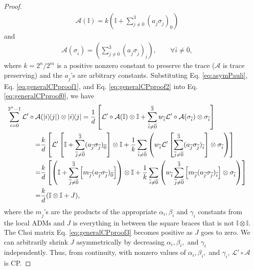 \documentclass[12pt]{iopart}
\begin{document}
\begin{proof}
\begin{align}
        \mathcal{A}(\mathbb{I})=k\left(\mathbb{I}+\sum_{\overline{j}\neq \overline{0}}^{\overline{3}}(a_{\overline{j}}\sigma_{\overline{j}})_0\right)
    \end{align}
    and
    \begin{align}\label{eq:generalCPproof2}
        \mathcal{A}(\sigma_{\overline{i}})=\left(\sum_{\overline{j}\neq \overline{0}}^{\overline{3}}(a_{\overline{j}}\sigma_{\overline{j}})_{\overline{i}}\right),\qquad \forall \overline{i}\neq \overline{0},
    \end{align}
where $k=2^n/2^m$ is a positive nonzero constant to preserve the trace ($\mathcal{A}$ is trace preserving) and the $a_{\overline{j}}$'s are arbitrary constants. Substituting Eq. \eqref{eq:asymPauli}, Eq. \eqref{eq:generalCPproof1}, and Eq. \eqref{eq:generalCPproof2} into Eq. \eqref{eq:generalCPproof0}, we have
\begin{align}\label{eq:generalCPproof3}
    \notag\sum_{i=0}^{2^n-1}\mathcal{L'}\circ\mathcal{A}&(\op{i}{j})\otimes\op{i}{j}=\dfrac{1}{d}\left[\mathcal{L'}\circ\mathcal{A}(\mathbb{I})\otimes\mathbb{I}+\sum_{\overline{i}\neq\overline{0}}^{\overline{3}} w_{\overline{i}}\mathcal{L'}\circ\mathcal{A}(\sigma_{\overline{i}})\otimes\sigma_{\overline{i}}\right]\\
    \notag =&\dfrac{k}{d}\left[\mathcal{L'}\left[\mathbb{I}+\sum_{\overline{j}\neq \overline{0}}^{\overline{3}}(a_{\overline{j}}\sigma_{\overline{j}})_{\overline{0}}\right]\otimes\mathbb{I}+\dfrac{1}{k}\sum_{\overline{i}\neq \overline{0}}\left(w_{\overline{i}}\mathcal{L'}\left[\sum_{\overline{j}\neq \overline{0}}^{\overline{3}}(a_{\overline{j}}\sigma_{\overline{j}})_{\overline{i}}\right]\otimes\sigma_{\overline{i}}\right)\right]\\
    \notag=&\dfrac{k}{d}\left[\left(\mathbb{I}+\sum_{\overline{j}\neq \overline{0}}^{\overline{3}}\left[m_{\overline{j}}(a_{\overline{j}}\sigma_{\overline{j}})_{\overline{0}}\right]\right)\otimes\mathbb{I}+\dfrac{1}{k}\sum_{\overline{i}\neq \overline{0}}\left(w_{\overline{i}}\sum_{\overline{j}\neq \overline{0}}^{\overline{3}}\left[m_{\overline{j}}(a_{\overline{j}}\sigma_{\overline{j}})_{\overline{i}}\right]\otimes\sigma_{\overline{i}}\right)\right]\\
    =&\dfrac{k}{d}(\mathbb{I}\otimes\mathbb{I}+J),
\end{align}
where the $m_{\overline{j}}$'s are the products of the appropriate $\alpha_i, \beta_i$ and $\gamma_i$ constants from the local ADMs and $J$ is everything in between the square braces that is not $\mathbb{I}\otimes\mathbb{I}$. The Choi matrix Eq. \eqref{eq:generalCPproof3} becomes positive as $J$ goes to zero. We can arbitrarily shrink $J$ asymmetrically by decreasing $\alpha_i, \beta_i,$ and $\gamma_i$ independently. Thus, from continuity, with nonzero values of $\alpha_i, \beta_i,$ and $\gamma_i$, $\mathcal{L}'\circ\mathcal{A}$ is CP. 

\end{proof}
\end{document}
